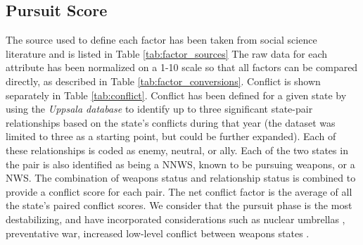 \subsection{Pursuit Score}\label{s_pe}
The source used to define each factor has been taken from social science literature and is listed in Table \ref{tab:factor_sources} The raw data for each attribute has been normalized on a 1-10 scale so that all factors can be compared directly, as described in Table \ref{tab:factor_conversions}. Conflict is shown separately in Table \ref{tab:conflict}. Conflict has been defined for a given state by using the \emph{Uppsala database} to identify up to three significant state-pair relationships based on the state's conflicts during that year (the dataset was limited to three as a starting point, but could be further expanded).   Each of these relationships is coded as enemy, neutral, or ally.  Each of the two states in the pair is also identified as being a \gls{NNWS}, known to be pursuing weapons, or a \gls{NWS}.  The combination of weapons status and relationship status is combined to provide a conflict score for each pair. The net conflict factor is the average of all the state's paired conflict scores. We consider that the pursuit phase is the most destabilizing, and have incorporated considerations such as nuclear umbrellas ,  preventative war, increased low-level conflict between weapons states \cite{geller_nuclear_1990, fuhrmann_targeting_2010, bell_questioning_2013-1}.

